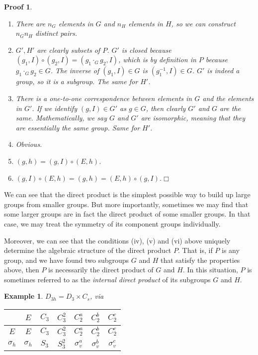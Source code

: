 \documentclass{article}
\theoremstyle{plain}\theoremheaderfont{\normalfont\itshape}\theorembodyfont{\rmfamily}\theoremseparator{.}\newtheorem*{rem}{Remark}\newtheorem*{ex}{Example}\newtheorem*{proof}{Proof}\newtheorem*{altp}{Alternative proof}
\theoremstyle{plain}\theoremheaderfont{\normalfont\bfseries}\theorembodyfont{\rmfamily}\theoremseparator{.}\newtheorem{thm}{Theorem}[section]\newtheorem{lem}[thm]{Lemma}\newtheorem{prop}[thm]{Proposition}\newtheorem*{cor}{Corollary}\newtheorem{defn}[thm]{Definition}\newtheorem{clm}[thm]{Claim}\newtheorem{clminproof}{Claim}\newtheorem*{law}{Law}\newtheorem{pos}[thm]{Postulate}
\theoremstyle{break}\theoremheaderfont{\normalfont\itshape}\theorembodyfont{\rmfamily}\theoremseparator{.\medskip}\newtheorem*{proofskip}{Proof}\newtheorem*{exs}{Examples}\newtheorem*{rems}{Remarks}
\theoremstyle{break}\theoremheaderfont{\normalfont\bfseries}\theorembodyfont{\rmfamily}\theoremseparator{.\medskip}\newtheorem{lemskip}[thm]{Lemma}\newtheorem{defnskip}[thm]{Definition}\newtheorem{propskip}[thm]{Proposition}\newtheorem{thmskip}[thm]{Theorem}
\numberwithin{equation}{section}
\newcommand{\qed}{\hfill\ensuremath{\Box}}
\begin{document}
    \begin{proofskip}
        \begin{enumerate}[topsep=0pt,label=(\roman*)]
            \item There are \(n_G\) elements in \(G\) and \(n_H\) elements in \(H\), so we can construct \(n_G n_H\) distinct pairs.
            \item \(G',H'\) are clearly subsets of \(P\). \(G'\) is closed because \((g_1,I)\circ (g_2,I)=(g_1\cdot_G g_2,I)\), which is by definition in \(P\) because \(g_1\cdot_G g_2\in G\). The inverse of \((g_1,I)\in G\) is \((g_1^{-1},I)\in G\). \(G'\) is indeed a group, so it is a subgroup. The same for \(H'\).
            \item There is a one-to-one correspondence between elements in \(G\) and the elements in \(G'\). If we identify \((g,I)\in G'\) as \(g\in G\), then clearly \(G'\) and \(G\) are the same. Mathematically, we say \(G\) and \(G'\) are \textit{isomorphic}, meaning that they are essentially the same group. Same for \(H'\).
            \item Obvious.
            \item \((g,h)=(g,I)\circ(E,h)\).
            \item \((g,I)\circ(E,h)=(g,h)=(E,h)\circ(g,I)\).\qed
        \end{enumerate}
    \end{proofskip}
    We can see that the direct product is the simplest possible way to build up large groups from smaller groups. But more importantly, sometimes we may find that some larger groups are in fact the direct product of some smaller groups. In that case, we may treat the symmetry of its component groups individually.

    Moreover, we can see that the conditions (iv), (v) and (vi) above uniquely determine the algebraic structure of the direct product \(P\). That is, if \(P\) is any group, and we have found two subgroups \(G\) and \(H\) that satisfy the properties above, then \(P\) is necessarily the direct product of \(G\) and \(H\). In this situation, \(P\) is sometimes referred to as the \textit{internal direct product} of its subgroups \(G\) and \(H\).

    \begin{ex}
        \(D_{3h}=D_3\times C_s\), via
        \begin{table}[ht!]
            \centering\renewcommand{\arraystretch}{1.3}
            \begin{tabular}{c|cccccc}
                ~ &\(E\) & \(C_3\) & \(C_3^2\) & \(C_2^a\) & \(C_2^b\) & \(C_2^c\) \\ \hline
                \(E\) & \(E\) & \(C_3\) & \(C_3^2\) & \(C_2^a\) & \(C_2^b\) & \(C_2^c\) \\
                \(\sigma_h\) & \(\sigma_h\) & \(S_3\) & \(S_3^2\) & \(\sigma_v^a\) & \(\sigma_v^b\) & \(\sigma_v^c\)
            \end{tabular}
        \end{table}
    \end{ex}
    
\end{document}
